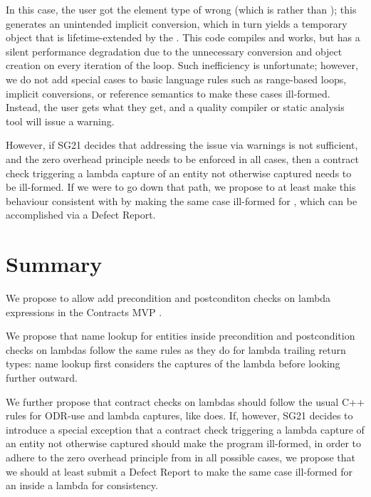 In this case, the user got the element type of  wrong (which is  rather than ); this generates an unintended implicit conversion, which in turn yields a temporary object that is lifetime-extended by the . This code compiles and works, but has a silent performance degradation due to the unnecessary conversion and object creation on every iteration of the loop. Such inefficiency is unfortunate; however, we do not add special cases to basic language rules such as range-based  loops, implicit conversions, or reference semantics to make these cases ill-formed. Instead, the user gets what they get, and a quality compiler or static analysis tool will issue a warning.

However, if SG21 decides that addressing the issue via warnings is not sufficient, and the zero overhead principle needs to be enforced in all cases, then a contract check triggering a lambda capture of an entity not otherwise captured needs to be ill-formed. If we were to go down that path, we propose to at least make this behaviour consistent with \tcode{[[assume]]} by making the same case ill-formed for \tcode{[[assume]]}, which can be accomplished via a Defect Report.

\section{Summary}

We propose to allow add precondition and postconditon checks on lambda expressions in the Contracts MVP \cite{P2900R1}.

We propose that name lookup for entities inside precondition and postcondition checks on lambdas follow the same rules as they do for lambda trailing return types: name lookup first considers the captures of the lambda before looking further outward.

We further propose that contract checks on lambdas should follow the usual C++ rules for ODR-use and lambda captures, like \tcode{[[assume]]} does. If, however, SG21 decides to introduce a special exception that a contract check triggering a lambda capture of an entity not otherwise captured should make the program ill-formed, in order to adhere to the zero overhead principle from \cite{P2932R1} in all possible cases, we propose that we should at least submit a Defect Report to make the same case ill-formed for an \tcode{[[assume]]} inside a lambda for consistency.





\renewcommand{\bibname}{References}




